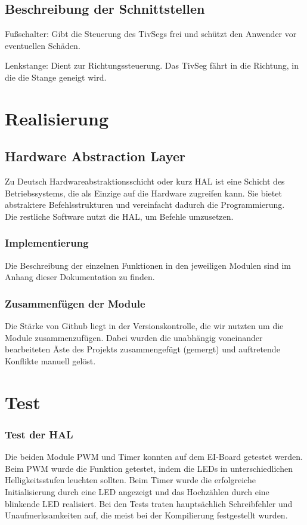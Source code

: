 \documentclass[a4paper,10pt,twoside]{report}
\begin{document}
\section{Beschreibung der Schnittstellen}

Fußschalter:
Gibt die Steuerung des TivSegs frei und schützt den Anwender vor eventuellen Schäden.

Lenkstange:
Dient zur Richtungssteuerung.
Das TivSeg fährt in die Richtung, in die die Stange geneigt wird.

\chapter{Realisierung}
\section{Hardware Abstraction Layer}
Zu Deutsch Hardwareabstraktionsschicht oder kurz HAL ist eine Schicht des Betriebssystems, die als Einzige auf die Hardware zugreifen kann. Sie bietet abstraktere Befehlsstrukturen und vereinfacht dadurch die Programmierung.\\
Die restliche Software nutzt die HAL, um Befehle umzusetzen.

\subsection{Implementierung}
Die Beschreibung der einzelnen Funktionen in den jeweiligen Modulen sind im Anhang dieser Dokumentation zu finden.
 
\subsection{Zusammenfügen der Module}
Die Stärke von Github liegt in der Versionskontrolle, die wir nutzten um die Module zusammenzufügen. Dabei wurden die unabhängig voneinander bearbeiteten Äste des Projekts zusammengefügt (gemergt) und auftretende Konflikte manuell gelöst.

\chapter{Test}

\subsection{Test der HAL}
Die beiden Module PWM und Timer konnten auf dem EI-Board getestet werden. Beim PWM wurde die Funktion getestet, indem die LEDs in unterschiedlichen Helligkeitsstufen leuchten sollten. Beim Timer wurde die erfolgreiche Initialisierung durch eine LED angezeigt und das Hochzählen durch eine blinkende LED realisiert.
Bei den Tests traten hauptsächlich Schreibfehler und Unaufmerksamkeiten auf, die meist bei der Kompilierung festgestellt wurden.
\end{document}
